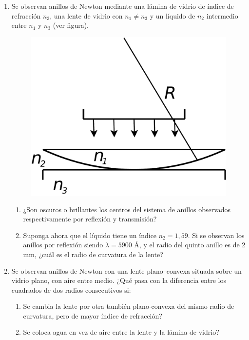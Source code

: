 \documentclass[11pt,spanish,a4paper]{article}
\begin{document}
\begin{enumerate}
\item Se observan anillos de Newton mediante una lámina de vidrio de índice
de refracción $n_{3}$, una lente de vidrio con $n_{1}\ne n_{3}$
y un líquido de $n_{2}$ intermedio entre $n_{1}$ y $n_{3}$ (ver
figura). 
\begin{figure}[H]
\centering{}\includegraphics[clip,scale=0.25]{ej5-26}
\end{figure}
\begin{enumerate}
\item ¿Son oscuros o brillantes los centros del sistema de anillos observados
respectivamente por reflexión y transmisión? 
\item Suponga ahora que el líquido tiene un índice $n_{2}=1,59$. Si se
observan los anillos por reflexión siendo $\lambda=5900$ Å, y el
radio del quinto anillo es de 2 mm, ¿cuál es el radio de curvatura
de la lente?
\end{enumerate}


\item Se observan anillos de Newton con una lente plano--convexa situada
sobre un vidrio plano, con aire entre medio. ¿Qué pasa con la diferencia
entre los cuadrados de dos radios consecutivos si: 
\begin{enumerate}
\item Se cambia la lente por otra también plano-convexa del mismo radio
de curvatura, pero de mayor índice de refracción? 
\item Se coloca agua en vez de aire entre la lente y la lámina de vidrio? 
\end{enumerate}



\end{enumerate}
\end{document}
